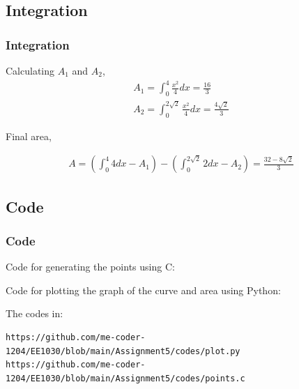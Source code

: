\documentclass{beamer}
\providecommand{\brak}[1]{\ensuremath{\left(#1\right)}}
\theoremstyle{remark}
\numberwithin{equation}{section}
\begin{document}
\subsection{Integration}
\begin{frame}
\frametitle{Integration}

Calculating $A_1$ and $A_2$,
\begin{align}
A_1 = \int_0^4 \frac{x^2}{4} dx = \frac{16}{3}\\
A_2 = \int_0^{2\sqrt{2}} \frac{x^2}{4} dx = \frac{4\sqrt{2}}{3}
\end{align}

Final area,

\begin{align}
A = \brak{\int_0^4 4 dx - A_1} - \brak{\int_0^{2\sqrt{2}}2 dx - A_2} = \frac{32-8\sqrt{2}}{3}
\end{align}

\end{frame}
\subsection{Code}
\begin{frame}
    \frametitle{Code}
    Code for generating the points using C:
    
    
    Code for plotting the graph of the curve and area using Python:
    

    The codes in: 
    {\footnotesize
        \begin{lstlisting}
https://github.com/me-coder-1204/EE1030/blob/main/Assignment5/codes/plot.py
https://github.com/me-coder-1204/EE1030/blob/main/Assignment5/codes/points.c
        \end{lstlisting}
    }
\end{frame}
\end{document}
